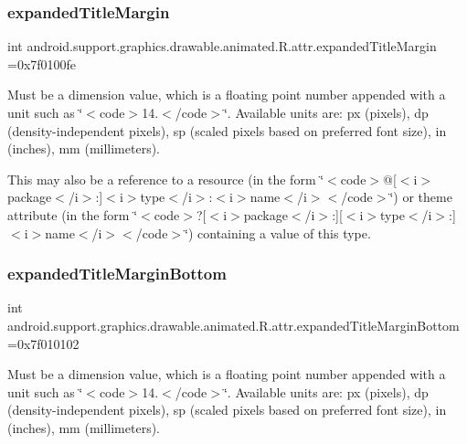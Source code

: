 \subsubsection{\texorpdfstring{expanded\+Title\+Margin}{expandedTitleMargin}}
{\footnotesize\ttfamily int android.\+support.\+graphics.\+drawable.\+animated.\+R.\+attr.\+expanded\+Title\+Margin =0x7f0100fe\hspace{0.3cm}{\ttfamily [static]}}

Must be a dimension value, which is a floating point number appended with a unit such as \char`\"{}$<$code$>$14.\+5sp$<$/code$>$\char`\"{}. Available units are\+: px (pixels), dp (density-\/independent pixels), sp (scaled pixels based on preferred font size), in (inches), mm (millimeters). 

This may also be a reference to a resource (in the form \char`\"{}$<$code$>$@\mbox{[}$<$i$>$package$<$/i$>$\+:\mbox{]}$<$i$>$type$<$/i$>$\+:$<$i$>$name$<$/i$>$$<$/code$>$\char`\"{}) or theme attribute (in the form \char`\"{}$<$code$>$?\mbox{[}$<$i$>$package$<$/i$>$\+:\mbox{]}\mbox{[}$<$i$>$type$<$/i$>$\+:\mbox{]}$<$i$>$name$<$/i$>$$<$/code$>$\char`\"{}) containing a value of this type. \mbox{\label{classandroid_1_1support_1_1graphics_1_1drawable_1_1animated_1_1R_1_1attr_afa13f75cbb34f1309c1ba6d26788e363}} 
\subsubsection{\texorpdfstring{expanded\+Title\+Margin\+Bottom}{expandedTitleMarginBottom}}
{\footnotesize\ttfamily int android.\+support.\+graphics.\+drawable.\+animated.\+R.\+attr.\+expanded\+Title\+Margin\+Bottom =0x7f010102\hspace{0.3cm}{\ttfamily [static]}}

Must be a dimension value, which is a floating point number appended with a unit such as \char`\"{}$<$code$>$14.\+5sp$<$/code$>$\char`\"{}. Available units are\+: px (pixels), dp (density-\/independent pixels), sp (scaled pixels based on preferred font size), in (inches), mm (millimeters). 

